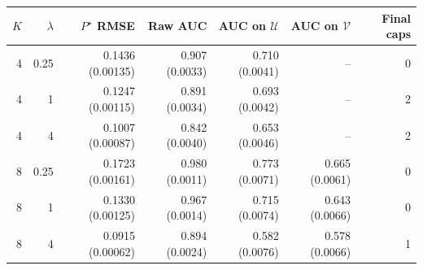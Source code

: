 \begin{tabular}{rrrrrrr}
\toprule
$K$ & $\lambda$ & $P^\star$ RMSE & Raw AUC & AUC on $\mathcal{U}$ & AUC on $\mathcal{V}$ & Final caps \\
\midrule
4 & 0.25 & 0.1436 (0.00135) & 0.907 (0.0033) & 0.710 (0.0041) & -- & 0 \\
4 & 1 & 0.1247 (0.00115) & 0.891 (0.0034) & 0.693 (0.0042) & -- & 2 \\
4 & 4 & 0.1007 (0.00087) & 0.842 (0.0040) & 0.653 (0.0046) & -- & 2 \\
\midrule
8 & 0.25 & 0.1723 (0.00161) & 0.980 (0.0011) & 0.773 (0.0071) & 0.665 (0.0061) & 0 \\
8 & 1 & 0.1330 (0.00125) & 0.967 (0.0014) & 0.715 (0.0074) & 0.643 (0.0066) & 0 \\
8 & 4 & 0.0915 (0.00062) & 0.894 (0.0024) & 0.582 (0.0076) & 0.578 (0.0066) & 1 \\
\bottomrule
\end{tabular}
